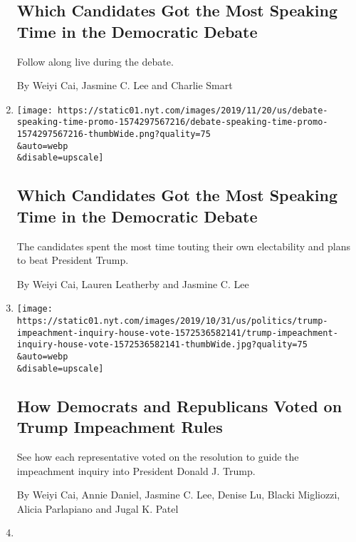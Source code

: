 \begin{enumerate}
{  \subsection{Which Candidates Got the Most Speaking Time in the
  Democratic
  Debate}\label{which-candidates-got-the-most-speaking-time-in-the-democratic-debate}}

  Follow along live during the debate.

  By Weiyi Cai, Jasmine C. Lee and Charlie Smart
\item
  \href{/interactive/2019/11/20/us/elections/debate-speaking-time.html}{}

  \texttt{[image: https://static01.nyt.com/images/2019/11/20/us/debate-speaking-time-promo-1574297567216/debate-speaking-time-promo-1574297567216-thumbWide.png?quality=75\\\&auto=webp\\\&disable=upscale]}

  \hypertarget{which-candidates-got-the-most-speaking-time-in-the-democratic-debate-1}{%
  \subsection{Which Candidates Got the Most Speaking Time in the
  Democratic
  Debate}\label{which-candidates-got-the-most-speaking-time-in-the-democratic-debate-1}}

  The candidates spent the most time touting their own electability and
  plans to beat President Trump.

  By Weiyi Cai, Lauren Leatherby and Jasmine C. Lee
\item
  \href{/interactive/2019/10/31/us/politics/trump-impeachment-inquiry-house-vote.html}{}

  \texttt{[image: https://static01.nyt.com/images/2019/10/31/us/politics/trump-impeachment-inquiry-house-vote-1572536582141/trump-impeachment-inquiry-house-vote-1572536582141-thumbWide.jpg?quality=75\\\&auto=webp\\\&disable=upscale]}

  \hypertarget{how-democrats-and-republicans-voted-on-trump-impeachment-rules}{%
  \subsection{How Democrats and Republicans Voted on Trump Impeachment
  Rules}\label{how-democrats-and-republicans-voted-on-trump-impeachment-rules}}

  See how each representative voted on the resolution to guide the
  impeachment inquiry into President Donald J. Trump.

  By Weiyi Cai, Annie Daniel, Jasmine C. Lee, Denise Lu, Blacki
  Migliozzi, Alicia Parlapiano and Jugal K. Patel
\item
  \href{/interactive/2019/10/15/us/elections/debate-speaking-time.html}{}


\end{enumerate}
